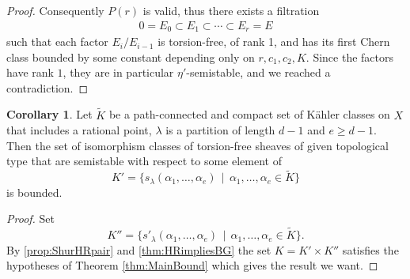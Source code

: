 \documentclass[a4,reqno]{amsart}
\theoremstyle{definition}
\newtheorem{corollary}[theorem]{Corollary}
\numberwithin{equation}{section}
\begin{document}
\begin{proof}
Consequently $P(r)$ is valid, thus there exists a filtration 
\begin{align*}
     0 = E_0 \subset E_1 \subset \cdots \subset E_r =E
\end{align*}
such that each factor $E_i/E_{i-1}$ is torsion-free, of rank 1, and has its first Chern class bounded by some constant depending only on $r, c_1, c_2, K$. Since the factors have rank $1$, they are in particular $\eta'$-semistable, and we reached a contradiction.
\end{proof}


\begin{corollary}\label{cor:boundednessschurkahler}
Let $\tilde{K}$ be a path-connected  and compact set of K\"ahler classes on $X$ that includes a rational point, $\lambda$ is a partition of length $d-1$ and $e\ge d-1$. Then the set of isomorphism classes of torsion-free sheaves of given topological type that are semistable with respect to some element of 
$$  K'=\{ s_{\lambda}(\alpha_1,\ldots,\alpha_e) \, \mid \, \alpha_1,\ldots,\alpha_e\in \tilde{K}\}$$
is bounded.
\end{corollary}
\begin{proof}
Set 
$$  K''=\{ s'_{\lambda}(\alpha_1,\ldots,\alpha_e) \, \mid \, \alpha_1,\ldots,\alpha_e\in \tilde{K}\}.$$
By \cref{prop:ShurHRpair} and \cref{thm:HRimpliesBG} the set $K=K'\times K''$ satisfies the hypotheses of Theorem \ref{thm:MainBound} which gives the result we want.
\end{proof}

\end{document}
